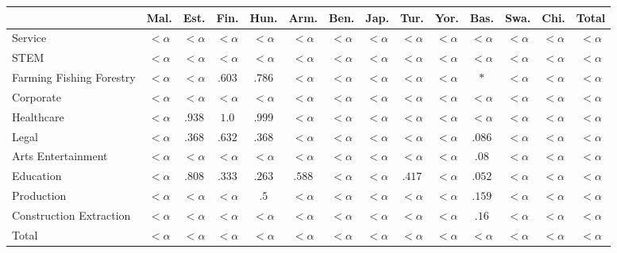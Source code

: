 \documentclass[twoside,11pt]{article}
\begin{document}
\begin{table}[H]
\centering
\footnotesize\setlength{\tabcolsep}{2.5pt}
\small
\begin{tabular}{|m{1.75cm}|cccccccccccc|c|}
\hline
& Mal. & Est. & Fin. & Hun. & Arm. & Ben. & Jap. & Tur. & Yor. & Bas. & Swa. & Chi. & Total \\ \hline
Service	&	$<\alpha$	&	$<\alpha$	&	$<\alpha$	&	$<\alpha$	&	$<\alpha$	&	$<\alpha$	&	$<\alpha$	&	$<\alpha$	&	$<\alpha$	&	$<\alpha$	&	$<\alpha$	&	$<\alpha$	&	$<\alpha$	 \\ \hline 
STEM	&	$<\alpha$	&	$<\alpha$	&	$<\alpha$	&	$<\alpha$	&	$<\alpha$	&	$<\alpha$	&	$<\alpha$	&	$<\alpha$	&	$<\alpha$	&	$<\alpha$	&	$<\alpha$	&	$<\alpha$	&	$<\alpha$	 \\ \hline 
Farming 
 Fishing 
 Forestry	&	$<\alpha$	&	$<\alpha$	&	\cellcolor{blue!25}$.603$	&	\cellcolor{blue!25}$.786$	&	$<\alpha$	&	$<\alpha$	&	$<\alpha$	&	$<\alpha$	&	$<\alpha$	&	\cellcolor{blue!25}$*$	&	$<\alpha$	&	$<\alpha$	&	$<\alpha$	 \\ \hline 
Corporate	&	$<\alpha$	&	$<\alpha$	&	$<\alpha$	&	$<\alpha$	&	$<\alpha$	&	$<\alpha$	&	$<\alpha$	&	$<\alpha$	&	$<\alpha$	&	$<\alpha$	&	$<\alpha$	&	$<\alpha$	&	$<\alpha$	 \\ \hline 
Healthcare	&	$<\alpha$	&	\cellcolor{blue!25}$.938$	&	\cellcolor{blue!45}$1.0$	&	\cellcolor{blue!45}$.999$	&	$<\alpha$	&	$<\alpha$	&	$<\alpha$	&	$<\alpha$	&	$<\alpha$	&	$<\alpha$	&	$<\alpha$	&	$<\alpha$	&	$<\alpha$	 \\ \hline 
Legal	&	$<\alpha$	&	\cellcolor{blue!25}$.368$	&	\cellcolor{blue!25}$.632$	&	\cellcolor{blue!25}$.368$	&	$<\alpha$	&	$<\alpha$	&	$<\alpha$	&	$<\alpha$	&	$<\alpha$	&	\cellcolor{blue!25}$.086$	&	$<\alpha$	&	$<\alpha$	&	$<\alpha$	 \\ \hline 
Arts 
 Entertainment	&	$<\alpha$	&	$<\alpha$	&	$<\alpha$	&	$<\alpha$	&	$<\alpha$	&	$<\alpha$	&	$<\alpha$	&	$<\alpha$	&	$<\alpha$	&	\cellcolor{blue!25}$.08$	&	$<\alpha$	&	$<\alpha$	&	$<\alpha$	 \\ \hline 
Education	&	$<\alpha$	&	\cellcolor{blue!25}$.808$	&	\cellcolor{blue!25}$.333$	&	\cellcolor{blue!25}$.263$	&	\cellcolor{blue!25}$.588$	&	$<\alpha$	&	$<\alpha$	&	\cellcolor{blue!25}$.417$	&	$<\alpha$	&	\cellcolor{blue!25}$.052$	&	$<\alpha$	&	$<\alpha$	&	$<\alpha$	 \\ \hline 
Production	&	$<\alpha$	&	$<\alpha$	&	$<\alpha$	&	\cellcolor{blue!25}$.5$	&	$<\alpha$	&	$<\alpha$	&	$<\alpha$	&	$<\alpha$	&	$<\alpha$	&	\cellcolor{blue!25}$.159$	&	$<\alpha$	&	$<\alpha$	&	$<\alpha$	 \\ \hline 
Construction 
 Extraction	&	$<\alpha$	&	$<\alpha$	&	$<\alpha$	&	$<\alpha$	&	$<\alpha$	&	$<\alpha$	&	$<\alpha$	&	$<\alpha$	&	$<\alpha$	&	\cellcolor{blue!25}$.16$	&	$<\alpha$	&	$<\alpha$	&	$<\alpha$	 \\ \hline 
Total	&	$<\alpha$	&	$<\alpha$	&	$<\alpha$	&	$<\alpha$	&	$<\alpha$	&	$<\alpha$	&	$<\alpha$	&	$<\alpha$	&	$<\alpha$	&	$<\alpha$	&	$<\alpha$	&	$<\alpha$	&	$<\alpha$	 \\ \hline 
 

\end{tabular}
\end{table}
\end{document}

